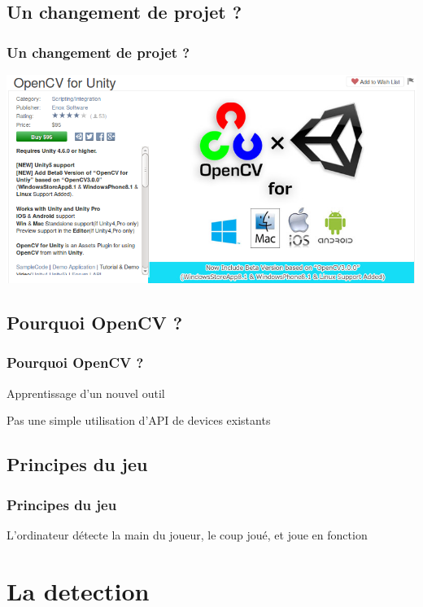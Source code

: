 \documentclass{beamer}
\begin{document}
\subsection{Un changement de projet ?}
\begin{frame}
  \begin{center}
    \frametitle{Un changement de projet ?}
    \includegraphics[scale=0.5]{./cher.png}
  \end{center}
\end{frame}
\subsection{Pourquoi OpenCV ?}
\begin{frame}
  \frametitle{Pourquoi OpenCV ?}
  \begin{block}{}
    Apprentissage d'un nouvel outil
  \end{block}
  \begin{block}{}
    Pas une simple utilisation d'API de devices existants
  \end{block}
\end{frame}
\subsection{Principes du jeu}
\begin{frame}
  \frametitle{Principes du jeu}
  L'ordinateur détecte la main du joueur, le coup joué, et joue en fonction
\end{frame}
\section{La detection}
\end{document}
